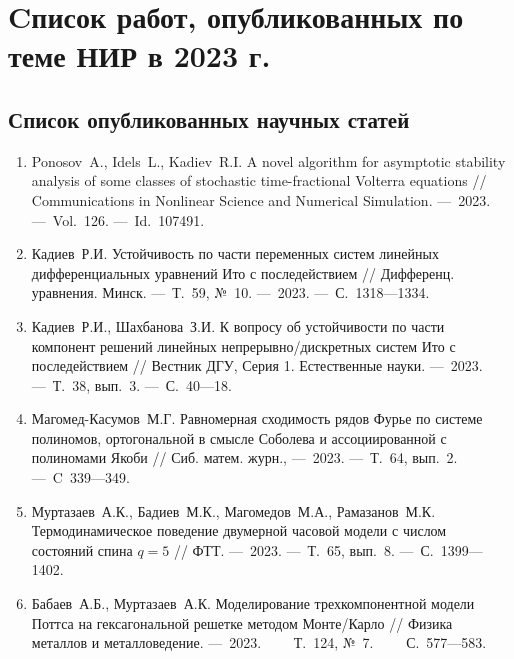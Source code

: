 \chapter{Cписок работ, опубликованных по теме НИР в 2023 г.}


\section*{Список опубликованных научных статей}

\begin{enumerate}

    \item
    \foreignlanguage{english}{%
        Ponosov~A., Idels~L., Kadiev~R.I.
        A novel algorithm for asymptotic stability analysis of some classes of stochastic time-fractional Volterra equations
        //
        Communications in Nonlinear Science and Numerical Simulation. 
        ---~2023.
        ---~Vol.~126.
        ---~Id.~107491.
    }

    \item 
    Кадиев~Р.И. 
    Устойчивость по части переменных систем линейных дифференциальных уравнений Ито с последействием 
    //
    Дифференц. уравнения. Минск. 
    ---~Т.~59, №~10.
    ---~2023. 
    ---~С.~1318---1334.

    \item 
    Кадиев~Р.И., Шахбанова~З.И. 
    К вопросу об устойчивости по части компонент решений линейных непрерывно\-/дискретных систем Ито с последействием 
    // 
    Вестник ДГУ, Серия 1. Естественные науки. 
    ---~2023.
    ---~Т.~38, вып.~3.
    ---~С.~40---18.

    \item
    Магомед-Касумов~М.Г. 
    Равномерная сходимость рядов Фурье по системе полиномов, ортогональной в смысле Соболева и ассоциированной с полиномами Якоби 
    // 
    Сиб. матем. журн., 
    ---~2023.
    ---~Т.~64, вып.~2.
    ---~C~339---349.

    \item
    Муртазаев~А.К., Бадиев~М.К., Магомедов~М.А., Рамазанов~М.К. 
    Термодинамическое поведение двумерной часовой модели с числом состояний спина $q = 5$ 
    // 
    ФТТ.
    ---~2023.
    ---~Т.~65, вып.~8.
    ---~С.~1399---1402.

    \item
    Бабаев~А.Б., Муртазаев~А.К. 
    Моделирование трехкомпонентной модели Поттса на гексагональной решетке методом Монте\-/Карло 
    // 
    Физика металлов и металловедение. 
    ---~2023.
    ~~~~Т.~124, №~7.
    ~~~~С.~577---583.


\end{enumerate}
